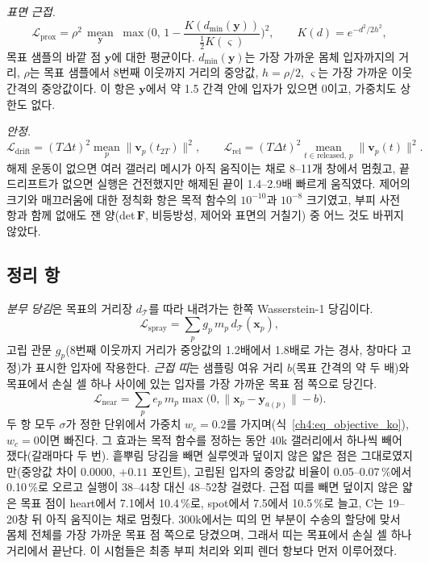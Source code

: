 \textit{표면 근접.}
\begin{equation}
\mathcal{L}_{\mathrm{prox}}=\rho^2\,\operatorname*{mean}_{\mathbf{y}}\;
 \max\!\Big(0,\,1-\frac{K(d_{\min}(\mathbf{y}))}{\tfrac12K(\varsigma)}\Big)^{2},
 \qquad K(d)=e^{-d^2/2h^2},
\end{equation}
목표 샘플의 바깥 점 $\mathbf{y}$에 대한 평균이다. $d_{\min}(\mathbf{y})$는 가장 가까운 몸체 입자까지의 거리, $\rho$는 목표
샘플에서 8번째 이웃까지 거리의 중앙값, $h=\rho/2$, $\varsigma$는 가장 가까운 이웃 간격의 중앙값이다. 이 항은 $\mathbf{y}$에서
약 1.5 간격 안에 입자가 있으면 0이고, 가중치도 상한도 없다.

\textit{안정.}
\begin{equation}
\mathcal{L}_{\mathrm{drift}}=(T\Delta t)^2\operatorname*{mean}_p\lVert\mathbf{v}_p(t_{2T})\rVert^2 ,\qquad
\mathcal{L}_{\mathrm{rel}}=(T\Delta t)^2\operatorname*{mean}_{t\in\text{released},\,p}\lVert\mathbf{v}_p(t)\rVert^2 .
\end{equation}
해제 운동이 없으면 여러 갤러리 메시가 아직 움직이는 채로 8--11개 창에서 멈췄고, 끝 드리프트가 없으면 실행은 건전했지만
해제된 끝이 1.4--2.9배 빠르게 움직였다. 제어의 크기와 매끄러움에 대한 정칙화 항은 목적 함수의 $10^{-10}$과 $10^{-8}$
크기였고, 부피 사전 항과 함께 없애도 잰 양(det\,$\mathbf{F}$, 비등방성, 제어와 표면의 거칠기) 중 어느 것도 바뀌지 않았다.

\subsection{정리 항}
\label{ch4:sec_cleanup_ko}
\emph{분무 당김}은 목표의 거리장 $d_{\mathcal{T}}$를 따라 내려가는 한쪽 Wasserstein-1 당김이다.
\begin{equation}
\label{ch4:eq_spray_ko}
\mathcal{L}_{\mathrm{spray}}=\sum_p g_p\, m_p\, d_{\mathcal{T}}(\mathbf{x}_p),
\end{equation}
고립 관문 $g_p$(8번째 이웃까지 거리가 중앙값의 1.2배에서 1.8배로 가는 경사, 창마다 고정)가 표시한 입자에 작용한다. \emph{근접
띠}는 샘플링 여유 거리 $b$(목표 간격의 약 두 배)와 목표에서 손실 셀 하나 사이에 있는 입자를 가장 가까운 목표 점 쪽으로 당긴다.
\begin{equation}
\label{ch4:eq_near_ko}
\mathcal{L}_{\mathrm{near}}=\sum_p e_p\, m_p\max\big(0,\lVert\mathbf{x}_p-\mathbf{y}_{a(p)}\rVert-b\big).
\end{equation}
두 항 모두 $\sigma$가 정한 단위에서 가중치 $w_c=0.2$를 가지며(식~\eqref{ch4:eq_objective_ko}), $w_c=0$이면 빠진다. 그 효과는
목적 함수를 정하는 동안 40k 갤러리에서 하나씩 빼어 쟀다(갈래마다 두 번). 흩뿌림 당김을 빼면 실루엣과 덮이지 않은 얇은 점은
그대로였지만(중앙값 차이 0.0000, $+0.11$ 포인트), 고립된 입자의 중앙값 비율이 0.05--0.07\,\%에서 0.10\,\%로 오르고 실행이
38--44창 대신 48--52창 걸렸다. 근접 띠를 빼면 덮이지 않은 얇은 목표 점이 heart에서 7.1에서 10.4\,\%로, spot에서 7.5에서
10.5\,\%로 늘고, C는 19--20창 뒤 아직 움직이는 채로 멈췄다. 300k에서는 띠의 먼 부분이 수송의 할당에 맞서 몸체 전체를 가장
가까운 목표 점 쪽으로 당겼으며, 그래서 띠는 목표에서 손실 셀 하나 거리에서 끝난다. 이 시험들은 최종 부피 처리와 외피 렌더
항보다 먼저 이루어졌다.

